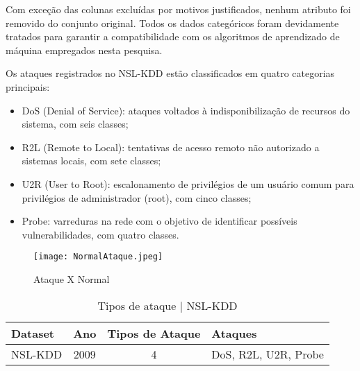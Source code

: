 \documentclass[conference]{IEEEtran}
\begin{document}
    Com exceção das colunas excluídas por motivos justificados, nenhum atributo foi removido do conjunto original. Todos os dados categóricos foram devidamente tratados para garantir a compatibilidade com os algoritmos de aprendizado de máquina empregados nesta pesquisa.
    

    Os ataques registrados no NSL-KDD estão classificados em quatro categorias principais:
    
    \begin{itemize}
        \item DoS (Denial of Service): ataques voltados à indisponibilização de recursos do sistema, com seis classes;
         \item R2L (Remote to Local): tentativas de acesso remoto não autorizado a sistemas locais, com sete classes;
         \item U2R (User to Root): escalonamento de privilégios de um usuário comum para privilégios de administrador (root), com cinco classes;
         \item Probe: varreduras na rede com o objetivo de identificar possíveis vulnerabilidades, com quatro classes.
    \end{itemize}

\hspace{1cm}


    \begin{figure}
        \centering
        \texttt{[image: NormalAtaque.jpeg]}
        \caption{Ataque X Normal }
        \label{tab:attack_datasets}
    \end{figure}

\begin{table}[h]
    \centering
    \begin{tabular}{|l|c|c|l|}
    \hline
    \rowcolor[HTML]{C0C0C0} 
    \textbf{Dataset} & \textbf{Ano} & \textbf{Tipos de Ataque} & \textbf{Ataques} \\ \hline
    NSL-KDD & 2009 & 4 & DoS,  R2L, U2R, Probe\\ \hline
    \end{tabular}
    \caption{Tipos de ataque | NSL-KDD}
    \label{tab:attack_datasets}
\end{table}
\end{document}

